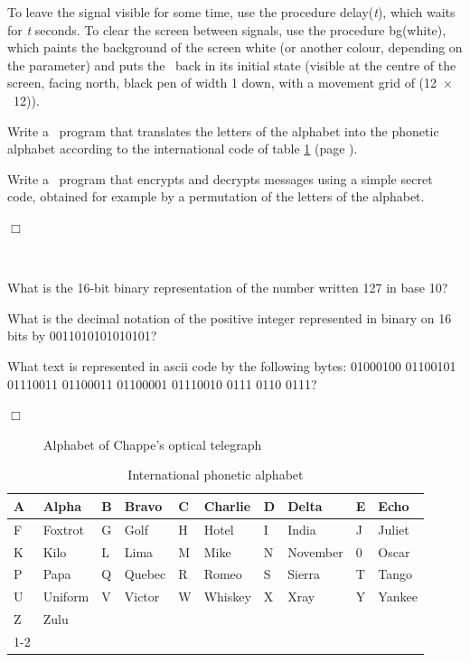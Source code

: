 \begin{exercices}
{  To leave the signal visible for some time, use the procedure
  {\idt delay({\rm\em t})}, which waits for {\rm\em t} seconds. To clear the screen
  between signals, use the procedure {\idt bg(white)}, which paints the background of the screen
  white (or another colour, depending on the parameter) and puts the \robot\ back in its initial state
  (visible at the centre of the screen, facing north, black pen of width 1 down, with a movement
  grid of (12~$\times$~12)).

  \tiret Write a \python\ program that translates the letters of the alphabet into the phonetic alphabet
  according to the international code of table \ref{tab:alphone} (page \pageref{tab:alphone}).

   \tiret Write a \python\ program that encrypts and decrypts messages using a simple
   secret code, obtained for example by a permutation of the letters of the alphabet.

\noindent $\Box$}\end{exercices}
\begin{exercices}{\ \\
\vspace{-\baselineskip}

\tiret What is the 16-bit binary representation of the number written 127
in base 10?

\tiret What is the decimal notation of the positive integer represented
in binary on 16 bits by 0011010101010101?

\tiret What text is represented in {\sc ascii} code by the following bytes:
01000100 01100101 01110011 01100011 01100001
01110010 0111 0110 0111?

\noindent $\Box$}\end{exercices}
\begin{figure}[htbp]
 \caption{Alphabet of Chappe's optical telegraph}\label{fig:chappe}
\end{figure}
\begin{table}[htbp]
\begin{center}
\begin{tabular}{@{}|l|l||l|l||l|l||l|l||l|l|@{}} \hline
A & Alpha   & B  & Bravo & C & Charlie & D & Delta   & E  & Echo \\\hline
F & Foxtrot  & G & Golf   & H  & Hotel & I & India & J & Juliet \\\hline
K  & Kilo & L & Lima & M & Mike   & N  & November & 0 & Oscar \\\hline
P & Papa   & Q  & Quebec & R & Romeo  & S & Sierra   & T  & Tango \\\hline
U & Uniform & V & Victor   & W  & Whiskey & X & Xray & Y & Yankee   \\\hline
Z  & Zulu &   \multicolumn{8}{c}{}   \\\cline{1-2}
\end{tabular}
\end{center}
\caption{International phonetic alphabet}\label{tab:alphone}
\end{table}
